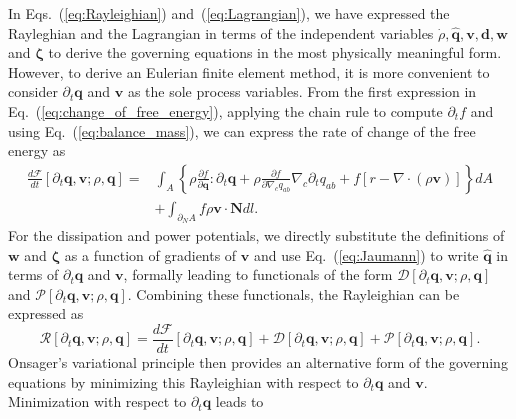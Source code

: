 \documentclass[12pt]{iopart}
\begin{document}
	In Eqs.~(\ref{eq:Rayleighian}) and~(\ref{eq:Lagrangian}), we have expressed the Rayleghian and the Lagrangian in terms of the independent variables $\dot{\rho},\widehat{\bm{q}},\bm{v},\bm{d},\bm{w}$ and $\bm{\zeta}$ to derive the governing equations in the most physically meaningful form. However, to derive an Eulerian finite element method, it is more convenient to  consider $\partial_t{\bm{q}}$ and $\bm{v}$ as the sole process variables. From the first expression in Eq.~(\ref{eq:change_of_free_energy}), applying the chain rule to compute $\partial_t f$ and using Eq.~(\ref{eq:balance_mass}), we can express the rate of change of the free energy as
	\begin{eqnarray} 
		\frac{d{\mathcal{F}}}{dt}\left[\partial_t\bm{q},\bm{v};\rho,\bm{q}\right] = &  \int_A \left\{ \rho \frac{\partial f}{\partial \bm{q}} : \partial_t \bm{q} + \rho \frac{\partial f}{\partial \nabla_c {q}_{ab}}  \nabla_c \partial_t {q}_{ab} + f \left[r-\nabla\cdot\left(\rho\bm{v}\right)\right] \right\}dA  \nonumber\\ 
		&  +  \int_{\partial_{N}A} f\rho \bm{v} \cdot\bm{N} dl. \label{eq:discrete_free_energy}
	\end{eqnarray}
	For the dissipation and power potentials, we directly substitute the definitions of $\bm{w}$ and $\bm{\zeta}$ as a function of gradients of $\bm{v}$ and use Eq.~(\ref{eq:Jaumann}) to write $\widehat{\bm{q}}$ in terms of $\partial_t \bm{q}$ and $\bm{v}$, formally leading to functionals of the form $\mathcal{D}[\partial_t\bm{q},\bm{v};\rho,\bm{q}]$ and $\mathcal{P}[\partial_t\bm{q},\bm{v};\rho,\bm{q}]$.
	Combining these functionals, the Rayleighian can be expressed as
	\begin{equation}  \label{eq:ray_discrte}
		\mathcal{R}[\partial_t\bm{q},\bm{v};\rho,\bm{q}] = \frac{d{\mathcal{F}}}{dt}[\partial_t\bm{q},\bm{v};\rho,\bm{q}]+ \mathcal{D}[\partial_t\bm{q},\bm{v};\rho,\bm{q}]+ \mathcal{P}[\partial_t\bm{q},\bm{v};\rho,\bm{q}].
	\end{equation}
	Onsager's variational principle then provides an alternative form of the governing equations by minimizing this Rayleighian with respect to $\partial_t \bm{q}$ and $\bm{v}$.  Minimization with respect to  $\partial_t\bm{q}$ leads to 
\end{document}
